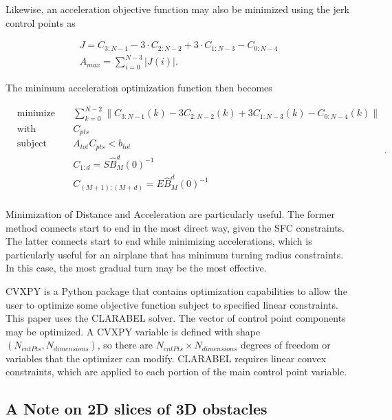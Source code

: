 Likewise, an acceleration objective function may also be minimized using the jerk control points as

\begin{align}
    J = C_{3:N-1} - 3 \cdot C_{2:N-2} + 3 \cdot C_{1:N-3} - C_{0:N-4}\\
    A_{max} = 
    \sum_{i=0}^{N-3} |J(i)|.
\end{align}

The minimum acceleration optimization function then becomes

\begin{equation}\label{eq:controlPointsOptimization}
    \begin{aligned}
        &\text{minimize} && \sum_{k=0}^{N-2} \|C_{3:N-1}(k) - 3 C_{2:N-2}(k) + 3 C_{1:N-3}(k) - C_{0:N-4}(k)\|\\
        &\text{with respect to} && C_{pts}\\
        &\text{subject to} && A_{tot} C_{pts} < b_{tot}\\
        &&& C_{1:d} = S \hat{B}_M^d(0)^{-1}\\
        &&& C_{(M+1):(M+d)} = E \hat{B}_M^d(0)^{-1}\\
    \end{aligned}.
\end{equation}

Minimization of Distance and Acceleration are particularly useful. 
The former method connects start to end in the most direct way, given the SFC constraints. 
The latter connects start to end while minimizing accelerations, which is particularly useful for an airplane that has minimum turning radius constraints. 
In this case, the most gradual turn may be the most effective.

CVXPY is a Python package that contains optimization capabilities to allow the user to optimize some objective function subject to specified linear constraints. 
This paper uses the CLARABEL solver. 
The vector of control point components may be optimized. 
A CVXPY variable is defined with shape $(N_{cntPts}, N_{dimensions})$, so there are $N_{cntPts} \times N_{dimensions}$ degrees of freedom or variables that the optimizer can modify. 
CLARABEL requires linear convex constraints, which are applied to each portion of the main control point variable.

\subsection{A Note on 2D slices of 3D obstacles}

